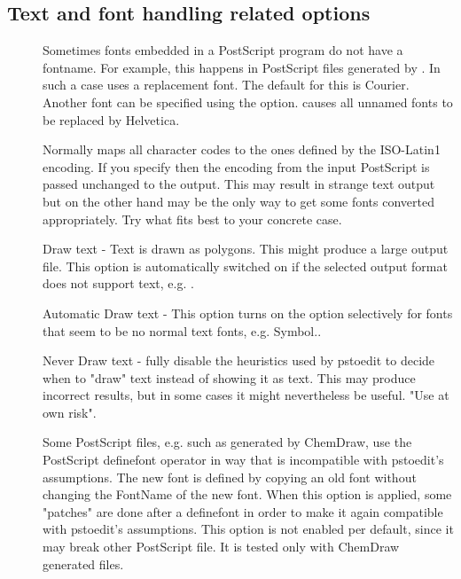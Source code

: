 \documentclass[english,a4paper]{article}
\begin{document}
\subsection{Text and font handling related options}
\begin{description}
\item[] 
 Sometimes fonts embedded in a PostScript program do not have a fontname. For example, this happens in PostScript files generated by . In such a case  uses a replacement font. The default for this is Courier. Another font can be specified using the  option.  causes all unnamed fonts to be replaced by Helvetica. 


\item[] 
Normally  maps all character codes to the ones defined by the ISO-Latin1 encoding. If you specify  then the encoding from the input PostScript is passed unchanged to the output. This may result in strange text output but on the other hand may be the only way to get some fonts converted appropriately. Try what fits best to your concrete case. 


\item[] 
Draw text - Text is drawn as polygons. This might produce a large output file. This option is automatically switched on if the selected output format does not support text, e.g. .


\item[] 
Automatic Draw text - This option turns on the  option selectively for fonts that seem to be no normal text fonts, e.g. Symbol..


\item[] 
Never Draw text -  fully disable the heuristics used by pstoedit to decide when to "draw" text instead of showing it as text. This may produce incorrect results, but in some cases it might nevertheless be useful. "Use at own risk". 


\item[] 
Some PostScript files, e.g. such as generated by ChemDraw, use the PostScript definefont operator in way that is incompatible with pstoedit's assumptions. The new font is defined by copying an old font without changing the FontName of the new font. When this option is applied, some "patches" are done after a definefont in order to make it again compatible with pstoedit's assumptions. This option is not enabled per default, since it may break other PostScript file. It is tested only with ChemDraw generated files.



\end{description}
\end{document}
